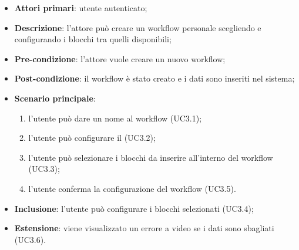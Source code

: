 \begin{itemize}
\item \textbf{Attori primari}: utente autenticato;

\item \textbf{Descrizione}: l'attore può creare un workflow personale scegliendo e configurando i blocchi tra quelli disponibili;

\item \textbf{Pre-condizione}: l'attore vuole creare un nuovo workflow;

\item \textbf{Post-condizione}: il workflow è stato creato e i dati sono inseriti nel sistema;

\item \textbf{Scenario principale}:
\begin{enumerate}
\item l'utente può dare un nome al workflow (UC3.1);
\item l'utente può configurare il \BBenvenuto{} (UC3.2);
\item l'utente può selezionare i blocchi da inserire all'interno del workflow (UC3.3);
\item l'utente conferma la configurazione del workflow (UC3.5).

\end{enumerate}
\item \textbf{Inclusione}: l'utente può configurare i blocchi selezionati (UC3.4);
\item \textbf{Estensione}: viene visualizzato un errore a video se i dati sono sbagliati (UC3.6).
\end{itemize}

